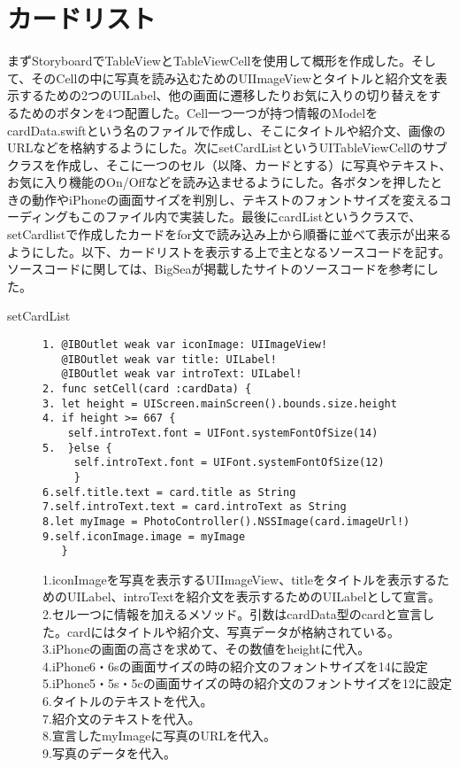 \section{カードリスト}
まずStoryboardでTableViewとTableViewCellを使用して概形を作成した。そして、そのCellの中に写真を読み込むためのUIImageViewとタイトルと紹介文を表示するための2つのUILabel、他の画面に遷移したりお気に入りの切り替えをするためのボタンを4つ配置した。Cell一つ一つが持つ情報のModelをcardData.swiftという名のファイルで作成し、そこにタイトルや紹介文、画像のURLなどを格納するようにした。次にsetCardListというUITableViewCellのサブクラスを作成し、そこに一つのセル（以降、カードとする）に写真やテキスト、お気に入り機能のOn/Offなどを読み込ませるようにした。各ボタンを押したときの動作やiPhoneの画面サイズを判別し、テキストのフォントサイズを変えるコーディングもこのファイル内で実装した。最後にcardListというクラスで、setCardlistで作成したカードをfor文で読み込み上から順番に並べて表示が出来るようにした。以下、カードリストを表示する上で主となるソースコードを記す。ソースコードに関しては、BigSeaが掲載したサイト\cite{CUSTOMCELL}のソースコードを参考にした。

\begin{description}
\item[setCardList]\mbox{} 
\begin{lstlisting}[basicstyle=\ttfamily\footnotesize, frame=single]
1. @IBOutlet weak var iconImage: UIImageView!
   @IBOutlet weak var title: UILabel!
   @IBOutlet weak var introText: UILabel!
2. func setCell(card :cardData) {
3. let height = UIScreen.mainScreen().bounds.size.height
4. if height >= 667 {
    self.introText.font = UIFont.systemFontOfSize(14)
5.  }else {
     self.introText.font = UIFont.systemFontOfSize(12)
     }
6.self.title.text = card.title as String
7.self.introText.text = card.introText as String
8.let myImage = PhotoController().NSSImage(card.imageUrl!)
9.self.iconImage.image = myImage
   }
 \end{lstlisting}

1.iconImageを写真を表示するUIImageView、titleをタイトルを表示するためのUILabel、introTextを紹介文を表示するためのUILabelとして宣言。\\
2.セル一つに情報を加えるメソッド。引数はcardData型のcardと宣言した。cardにはタイトルや紹介文、写真データが格納されている。\\
3.iPhoneの画面の高さを求めて、その数値をheightに代入。\\
4.iPhone6・6sの画面サイズの時の紹介文のフォントサイズを14に設定 \\
5.iPhone5・5s・5cの画面サイズの時の紹介文のフォントサイズを12に設定 \\
6.タイトルのテキストを代入。 \\
7.紹介文のテキストを代入。 \\
8.宣言したmyImageに写真のURLを代入。 \\
9.写真のデータを代入。 \\
\end{description}

